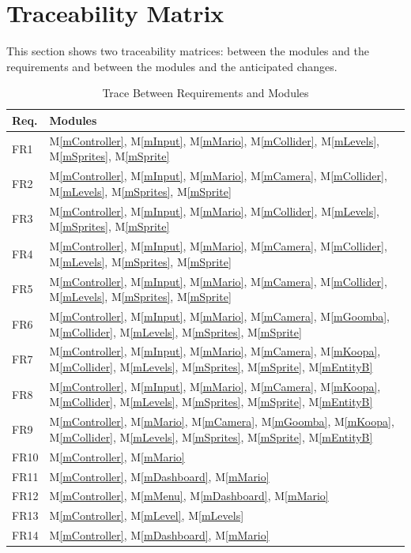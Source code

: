 \documentclass[12pt, titlepage]{article}
\newcommand{\mref}[1]{M\ref{#1}}
\begin{document}
\section{Traceability Matrix} \label{SecTM}

This section shows two traceability matrices: between the modules and the
requirements and between the modules and the anticipated changes.

\begin{table}[H]
\centering
\begin{tabular}{p{} p{}}
\toprule
\textbf{Req.} & \textbf{Modules}\\
\midrule
FR1 & \mref{mController}, \mref{mInput}, \mref{mMario}, \mref{mCollider}, \mref{mLevels}, \mref{mSprites}, \mref{mSprite}\\
FR2 & \mref{mController}, \mref{mInput}, \mref{mMario}, \mref{mCamera}, \mref{mCollider}, \mref{mLevels}, \mref{mSprites}, \mref{mSprite}\\
FR3 & \mref{mController}, \mref{mInput}, \mref{mMario}, \mref{mCollider}, \mref{mLevels}, \mref{mSprites}, \mref{mSprite}\\
FR4 & \mref{mController}, \mref{mInput}, \mref{mMario}, \mref{mCamera}, \mref{mCollider}, \mref{mLevels}, \mref{mSprites}, \mref{mSprite}\\
FR5 & \mref{mController}, \mref{mInput}, \mref{mMario}, \mref{mCamera}, \mref{mCollider}, \mref{mLevels}, \mref{mSprites}, \mref{mSprite}\\
FR6 & \mref{mController}, \mref{mInput}, \mref{mMario}, \mref{mCamera}, \mref{mGoomba}, \mref{mCollider}, \mref{mLevels}, \mref{mSprites}, \mref{mSprite}\\
FR7 & \mref{mController}, \mref{mInput}, \mref{mMario}, \mref{mCamera}, \mref{mKoopa}, \mref{mCollider}, \mref{mLevels}, \mref{mSprites}, \mref{mSprite}, \mref{mEntityB}\\
FR8 & \mref{mController}, \mref{mInput}, \mref{mMario}, \mref{mCamera}, \mref{mKoopa}, \mref{mCollider}, \mref{mLevels}, \mref{mSprites}, \mref{mSprite}, \mref{mEntityB}\\
FR9 & \mref{mController}, \mref{mMario}, \mref{mCamera}, \mref{mGoomba}, \mref{mKoopa}, \mref{mCollider}, \mref{mLevels}, \mref{mSprites}, \mref{mSprite}, \mref{mEntityB}\\
FR10 & \mref{mController}, \mref{mMario} \\
FR11 & \mref{mController}, \mref{mDashboard}, \mref{mMario}\\
FR12 & \mref{mController}, \mref{mMenu}, \mref{mDashboard}, \mref{mMario}\\
FR13 & \mref{mController}, \mref{mLevel}, \mref{mLevels}\\
FR14 & \mref{mController}, \mref{mDashboard}, \mref{mMario}\\

\bottomrule
\end{tabular}
\caption{Trace Between Requirements and Modules}
\label{TblRT}
\end{table}
\end{document}

